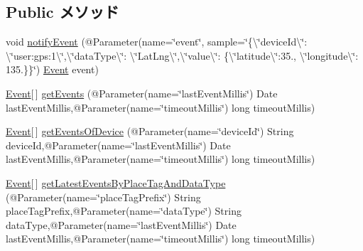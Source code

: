 \subsection*{Public メソッド}
\begin{DoxyCompactItemize}
\item 
void \hyperlink{interfacejp_1_1ac_1_1kyoto__u_1_1i_1_1soc_1_1ai_1_1iostbase_1_1service_1_1intf_1_1_event_management_service_a829b12a486f5e521e14ddf23d9c93ba7}{notify\-Event} (@Parameter(name=\char`\"{}event\char`\"{}, sample=\char`\"{}\{\textbackslash{}\char`\"{}device\-Id\textbackslash{}\char`\"{}\-: \textbackslash{}\char`\"{}user\-:gps\-:1\textbackslash{}\char`\"{},\textbackslash{}\char`\"{}data\-Type\textbackslash{}\char`\"{}\-: \textbackslash{}\char`\"{}Lat\-Lng\textbackslash{}\char`\"{},\textbackslash{}\char`\"{}value\textbackslash{}\char`\"{}\-: \{\textbackslash{}\char`\"{}latitude\textbackslash{}\char`\"{}\-:35.,  \textbackslash{}\char`\"{}longitude\textbackslash{}\char`\"{}\-: 135.\}\}\char`\"{}) \hyperlink{classjp_1_1ac_1_1kyoto__u_1_1i_1_1soc_1_1ai_1_1iostbase_1_1service_1_1intf_1_1_event}{Event} event)
\item 
\hyperlink{classjp_1_1ac_1_1kyoto__u_1_1i_1_1soc_1_1ai_1_1iostbase_1_1service_1_1intf_1_1_event}{Event}\mbox{[}$\,$\mbox{]} \hyperlink{interfacejp_1_1ac_1_1kyoto__u_1_1i_1_1soc_1_1ai_1_1iostbase_1_1service_1_1intf_1_1_event_management_service_a4151a56ca77f1c5d9c985b5be55e35b2}{get\-Events} (@Parameter(name=\char`\"{}last\-Event\-Millis\char`\"{}) Date last\-Event\-Millis,@Parameter(name=\char`\"{}timeout\-Millis\char`\"{}) long timeout\-Millis)
\item 
\hyperlink{classjp_1_1ac_1_1kyoto__u_1_1i_1_1soc_1_1ai_1_1iostbase_1_1service_1_1intf_1_1_event}{Event}\mbox{[}$\,$\mbox{]} \hyperlink{interfacejp_1_1ac_1_1kyoto__u_1_1i_1_1soc_1_1ai_1_1iostbase_1_1service_1_1intf_1_1_event_management_service_a8b88c46f46145ab5c8ddf33631c56c22}{get\-Events\-Of\-Device} (@Parameter(name=\char`\"{}device\-Id\char`\"{}) String device\-Id,@Parameter(name=\char`\"{}last\-Event\-Millis\char`\"{}) Date last\-Event\-Millis,@Parameter(name=\char`\"{}timeout\-Millis\char`\"{}) long timeout\-Millis)
\item 
\hyperlink{classjp_1_1ac_1_1kyoto__u_1_1i_1_1soc_1_1ai_1_1iostbase_1_1service_1_1intf_1_1_event}{Event}\mbox{[}$\,$\mbox{]} \hyperlink{interfacejp_1_1ac_1_1kyoto__u_1_1i_1_1soc_1_1ai_1_1iostbase_1_1service_1_1intf_1_1_event_management_service_adfcffbb38a4756b18bee3a22c9dbd0fe}{get\-Latest\-Events\-By\-Place\-Tag\-And\-Data\-Type} (@Parameter(name=\char`\"{}place\-Tag\-Prefix\char`\"{}) String place\-Tag\-Prefix,@Parameter(name=\char`\"{}data\-Type\char`\"{}) String data\-Type,@Parameter(name=\char`\"{}last\-Event\-Millis\char`\"{}) Date last\-Event\-Millis,@Parameter(name=\char`\"{}timeout\-Millis\char`\"{}) long timeout\-Millis)

\end{DoxyCompactItemize}
